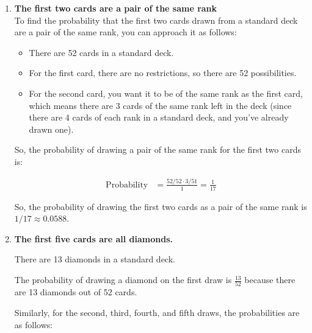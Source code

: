 {\begin{enumerate}
\begin{enumerate}
	Same as item (a) we can use the complement rule:
	\[ \text{Probability (at least one ace in the first five cards)} =\]
	\[ 1 - \text{ Probability (no aces in the first five cards)} \]
	
	Same as previous item, the probability of not getting an ace on the first 5 cards, is:
	\[ \frac{48}{52} \cdot \frac{47}{51} \cdot \frac{46}{50} \cdot \frac{45}{49} \cdot \frac{44}{28}\]
	
	So, the probability that the first five cards include at least one ace:
	\[ 1 - \left(\frac{48}{52} \cdot \frac{47}{51} \cdot \frac{46}{50} \cdot \frac{45}{49} \cdot \frac{44}{28} \right) \approx 0.3147 \]
	
	\item \textbf{The first two cards are a pair of the same rank}\\
	To find the probability that the first two cards drawn from a standard deck are a pair of the same rank, you can approach it as follows:
	
	\begin{itemize}
	\item There are 52 cards in a standard deck.
	\item For the first card, there are no restrictions, so there are 52 possibilities.
	\item For the second card, you want it to be of the same rank as the first card, which means there are 3 cards of the same rank left in the deck (since there are 4 cards of each rank in a standard deck, and you've already drawn one).
	\end{itemize}
	
	So, the probability of drawing a pair of the same rank for the first two cards is:
	
	\begin{align*}
	\text{Probability} &= \frac{52/52 \cdot 3/51}{1} = \frac{1}{17}
	\end{align*}
	
	So, the probability of drawing the first two cards as a pair of the same rank is $1/17 \approx 0.0588 $.
	
	\item \textbf{The first five cards are all diamonds.}
	
	There are 13 diamonds in a standard deck.
	
	The probability of drawing a diamond on the first draw is $ \frac{13}{52} $ because there are 13 diamonds out of 52 cards.
	
	Similarly, for the second, third, fourth, and fifth draws, the probabilities are as follows:
	

\end{enumerate}
\end{enumerate}}
